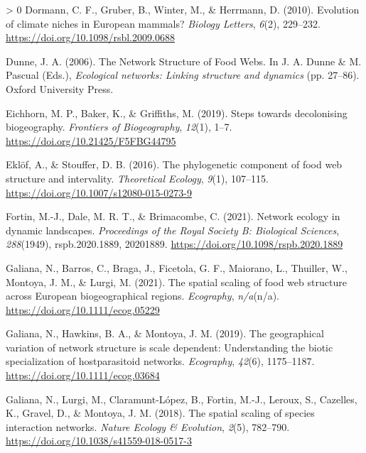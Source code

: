 \documentclass[10pt,oneside]{article}
\newlength{\cslhangindent}
\newenvironment{CSLReferences}[3] %
 {%
  \setlength{\parindent}{0pt}
  \ifodd #1 \everypar{\setlength{\hangindent}{\cslhangindent}}\ignorespaces\fi
  \ifnum #2 > 0
  \setlength{\parskip}{#2\baselineskip}
  \fi
 }%
 {}
\begin{document}
\begin{CSLReferences}{1}{0}
\leavevmode\hypertarget{ref-Dormann2010EvoCli}{}%
Dormann, C. F., Gruber, B., Winter, M., \& Herrmann, D. (2010).
Evolution of climate niches in European mammals? \emph{Biology Letters},
\emph{6}(2), 229--232. \url{https://doi.org/10.1098/rsbl.2009.0688}

\leavevmode\hypertarget{ref-Dunne2006NetStr}{}%
Dunne, J. A. (2006). The Network Structure of Food Webs. In J. A. Dunne
\& M. Pascual (Eds.), \emph{Ecological networks: Linking structure and
dynamics} (pp. 27--86). Oxford University Press.

\leavevmode\hypertarget{ref-Eichhorn2019SteDec}{}%
Eichhorn, M. P., Baker, K., \& Griffiths, M. (2019). Steps towards
decolonising biogeography. \emph{Frontiers of Biogeography},
\emph{12}(1), 1--7. \url{https://doi.org/10.21425/F5FBG44795}

\leavevmode\hypertarget{ref-Eklof2016PhyCom}{}%
Eklöf, A., \& Stouffer, D. B. (2016). The phylogenetic component of food
web structure and intervality. \emph{Theoretical Ecology}, \emph{9}(1),
107--115. \url{https://doi.org/10.1007/s12080-015-0273-9}

\leavevmode\hypertarget{ref-Fortin2021NetEco}{}%
Fortin, M.-J., Dale, M. R. T., \& Brimacombe, C. (2021). Network ecology
in dynamic landscapes. \emph{Proceedings of the Royal Society B:
Biological Sciences}, \emph{288}(1949), rspb.2020.1889, 20201889.
\url{https://doi.org/10.1098/rspb.2020.1889}

\leavevmode\hypertarget{ref-Galiana2021SpaSca}{}%
Galiana, N., Barros, C., Braga, J., Ficetola, G. F., Maiorano, L.,
Thuiller, W., Montoya, J. M., \& Lurgi, M. (2021). The spatial scaling
of food web structure across European biogeographical regions.
\emph{Ecography}, \emph{n/a}(n/a).
\url{https://doi.org/10.1111/ecog.05229}

\leavevmode\hypertarget{ref-Galiana2019GeoVar}{}%
Galiana, N., Hawkins, B. A., \& Montoya, J. M. (2019). The geographical
variation of network structure is scale dependent: Understanding the
biotic specialization of hostparasitoid networks. \emph{Ecography},
\emph{42}(6), 1175--1187. \url{https://doi.org/10.1111/ecog.03684}

\leavevmode\hypertarget{ref-Galiana2018SpaSca}{}%
Galiana, N., Lurgi, M., Claramunt-López, B., Fortin, M.-J., Leroux, S.,
Cazelles, K., Gravel, D., \& Montoya, J. M. (2018). The spatial scaling
of species interaction networks. \emph{Nature Ecology \& Evolution},
\emph{2}(5), 782--790. \url{https://doi.org/10.1038/s41559-018-0517-3}


\end{CSLReferences}
\end{document}
